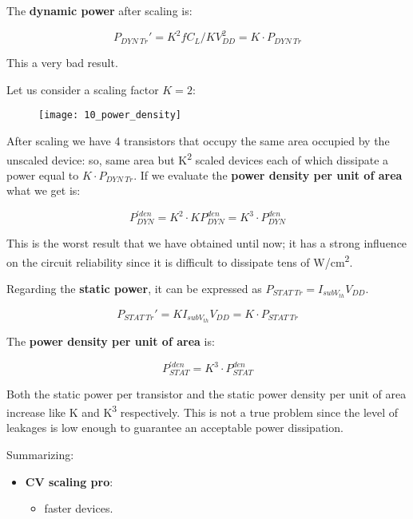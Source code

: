 \documentclass[a4paper, 12pt, twoside, openright]{report}
\newcommand{\super}{\textsuperscript}
\begin{document}
{The \textbf{dynamic power} after scaling is:

	\begin{equation}
	P_{DYN \ Tr}' =  K^2 f C_L/K V_{DD}^2 = K \cdot P_{DYN \ Tr}
	\end{equation}

This a very bad result.

Let us consider a scaling factor $K = 2$:

	\begin{figure}[H]
	\centering
	\texttt{[image: 10\_power\_density]}
	\caption{}
	\label{}
	\end{figure}

After scaling we have 4 transistors that occupy the same area occupied by the unscaled device: so, same area but K\super{2} scaled devices each of which dissipate a power equal to $K \cdot P_{DYN \ Tr}$. If we evaluate the \textbf{power density per unit of area} what we get is:

	\begin{equation}
	P^{'den}_{DYN} = K^2 \cdot KP_{DYN}^{den} = K^3 \cdot P^{den}_{DYN}
	\end{equation}

This is the worst result that we have obtained until now; it has a strong influence on the circuit reliability since it is difficult to dissipate tens of W/cm\super{2}.

Regarding the \textbf{static power}, it can be expressed as $P_{STAT \ Tr} = I_{subV_{th}} V_{DD}$.

	\begin{equation}
	P_{STAT \ Tr}' = K I_{subV_{th}} V_{DD} = K \cdot P_{STAT \ Tr}
	\end{equation}

The \textbf{power density per unit of area} is:

	\begin{equation}
	P^{'den}_{STAT} = K^3 \cdot P^{den}_{STAT}
	\end{equation}

Both the static power per transistor and the static power density per unit of area increase like K and K\super{3} respectively. This is not a true problem since the level of leakages is low enough to guarantee an acceptable power dissipation.

Summarizing:

\begin{itemize}
\item \textbf{CV scaling pro}:
	
	\begin{itemize}
	\item faster devices.
	\end{itemize}


\end{itemize}}
\end{document}
